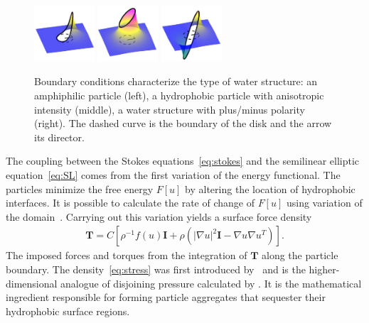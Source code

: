 \begin{figure}
  \vspace{-22pt}
  \includegraphics[width=0.2\textwidth]{figures/SpecificAim1/LPA.pdf}
  \includegraphics[width=0.2\textwidth]{figures/SpecificAim1/LPB.pdf}
  \includegraphics[width=0.2\textwidth]{figures/SpecificAim1/LPC.pdf}  
\caption{\label{fig:bcs} Boundary conditions characterize the type of
  water structure: an amphiphilic particle (left), a hydrophobic
  particle with anisotropic intensity (middle), a water structure with
  plus/minus polarity (right). The dashed curve is the boundary of the
  disk and the arrow its director.}
\end{figure}
The coupling between the Stokes equations~\eqref{eq:stokes} and the
semilinear elliptic equation~\eqref{eq:SL} comes from the first
variation of the energy functional. The particles minimize the free
energy $F[u]$ by altering the location of hydrophobic interfaces. It is
possible to calculate the rate of change of $F[u]$ using variation of
the domain~\cite{Bandle2015, Schiffer1954, Grinfeld2010}. Carrying out
this variation yields a 
surface force density 
\begin{align}
  \label{eq:stress}
\mathbf{T}
= C \left[ \rho^{-1} f(u) \mathbf{I}
  + \rho \left(|\nabla u|^2 \mathbf{I} - \nabla u \nabla u^T\right)\right].
\end{align}
The imposed forces and torques from the integration of $\mathbf{T}$
along the particle boundary. The density~\eqref{eq:stress} was first
introduced by~\cite{Fu2018_SIAM} and is the higher-dimensional analogue
of disjoining pressure calculated by \cite{MaRa76, ErLjCl89, KoNa15,
Nagle17, KUZMIN2005}. It is the mathematical ingredient responsible for
forming particle aggregates that sequester their hydrophobic surface
regions.

